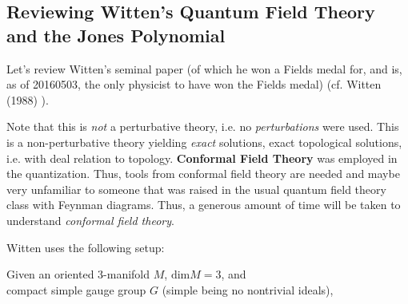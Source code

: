 \documentclass[10pt]{amsart}
\begin{document}
\begin{multicols}{2}

    







\subsection{Reviewing Witten's Quantum Field Theory and the Jones Polynomial}

Let's review Witten's seminal paper (of which he won a Fields medal for, and is, as of 20160503, the only physicist to have won the Fields medal) (cf. Witten (1988) \cite{Witten:1988hf}).  

Note that this is \emph{not} a perturbative theory, i.e. no \emph{perturbations} were used.  This is a non-perturbative theory yielding \emph{exact} solutions, exact topological solutions, i.e. with deal relation to topology.  \textbf{Conformal Field Theory} was employed in the quantization.  Thus, tools from conformal field theory are needed and maybe very unfamiliar to someone that was raised in the usual quantum field theory class with Feynman diagrams.  Thus, a generous amount of time will be taken to understand \emph{conformal field theory}.  

Witten uses the following setup:\cite{Witten:1988hf}

Given an oriented 3-manifold $M$, $\text{dim}M=3$, and \\
compact simple gauge group $G$ (simple being no nontrivial ideals),


\end{multicols}
\end{document}

